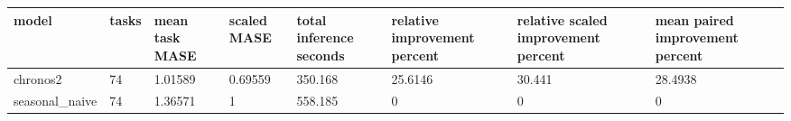\begin{tabular}{llllllll}
\toprule
model & tasks & mean task MASE & scaled MASE & total inference seconds & relative improvement percent & relative scaled improvement percent & mean paired improvement percent \\
\midrule
chronos2 & 74 & 1.01589 & 0.69559 & 350.168 & 25.6146 & 30.441 & 28.4938 \\
seasonal\_naive & 74 & 1.36571 & 1 & 558.185 & 0 & 0 & 0 \\
\bottomrule
\end{tabular}
